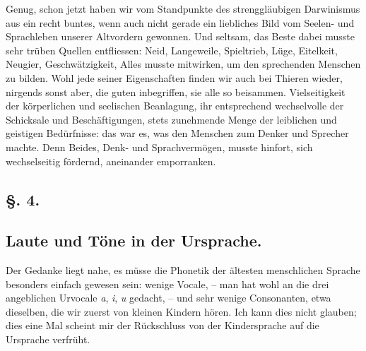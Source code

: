 
Genug, schon jetzt haben wir vom Standpunkte des strenggläubigen Darwinismus aus ein recht buntes, wenn auch nicht gerade ein liebliches Bild vom Seelen- und Sprachleben unserer Altvordern gewonnen. Und seltsam, das Beste dabei musste sehr trüben Quellen entfliessen: Neid, Langeweile, Spieltrieb, Lüge, Eitelkeit, Neugier, Geschwätzigkeit, Alles musste mitwirken, um den sprechenden Menschen zu bilden. Wohl jede seiner Eigenschaften finden wir auch bei Thieren wieder, nirgends sonst aber, die guten inbegriffen, sie alle so beisammen. Vielseitigkeit der körperlichen und seelischen Beanlagung, ihr entsprechend wechselvolle  der Schicksale und Beschäftigungen, stets zunehmende Menge der leiblichen und geistigen Bedürfnisse: das war es, was den Menschen zum Denker und Sprecher machte. Denn Beides, Denk- und Sprachvermögen, musste hinfort, sich wechselseitig fördernd, aneinander emporranken.

\subsection*{§. 4.}\label{IV.II.4}
\subsection*{Laute und Töne in der Ursprache.}

Der Gedanke liegt nahe, es müsse die Phonetik der ältesten menschlichen Sprache besonders einfach gewesen sein: wenige Vocale, – man \label{fp.304} hat wohl an die drei angeblichen Urvocale \textit{a}, \textit{i}, \textit{u} gedacht, – und sehr wenige Consonanten, etwa dieselben, die wir zuerst von kleinen Kindern hören. Ich kann dies nicht glauben; dies eine Mal scheint mir der Rückschluss von der Kindersprache auf die Ursprache verfrüht.

